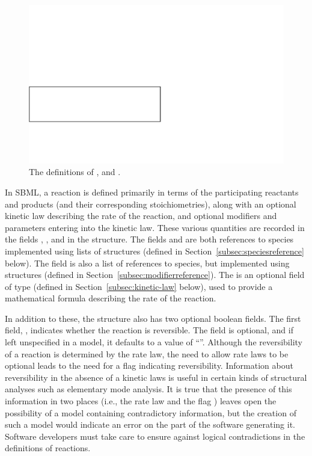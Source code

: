 \documentclass[10pt,twocolumntoc]{cekarticle}
\begin{document}
\begin{figure}[htb]
  \centering
  \includegraphics[scale = 0.68]{reaction}
  \caption{The definitions of ,  and
    .}
  \label{fig:reaction}
\end{figure}

In SBML, a reaction is defined primarily in terms of the participating
reactants and products (and their corresponding stoichiometries), along
with an optional kinetic law describing the rate of the reaction, and
optional modifiers and parameters entering into the kinetic law.  These
various quantities are recorded in the fields ,
,  and  in the
 structure.  The fields  and
 are both references to species implemented using lists of
 structures (defined in
Section~\ref{subsec:speciesreference} below).  The  field
is also a list of references to species, but implemented using
 structures (defined in
Section~\ref{subsec:modifierreference}).  The  is an
optional field of type  (defined in
Section~\ref{subsec:kinetic-law} below), used to provide a mathematical
formula describing the rate of the reaction.

In addition to these, the  structure also has two optional
boolean fields.  The first field, , indicates whether
the reaction is reversible.  The field is optional, and if left unspecified
in a model, it defaults to a value of ``''.  Although the
reversibility of a reaction is determined by the rate law, the need to
allow rate laws to be optional leads to the need for a flag indicating
reversibility.  Information about reversibility in the absence of a kinetic
laws is useful in certain kinds of structural analyses such as elementary
mode analysis.  It is true that the presence of this information in two
places (i.e., the rate law and the flag ) leaves open
the possibility of a model containing contradictory information, but the
creation of such a model would indicate an error on the part of the
software generating it.  Software developers must take care to ensure
against logical contradictions in the definitions of reactions.
\end{document}
